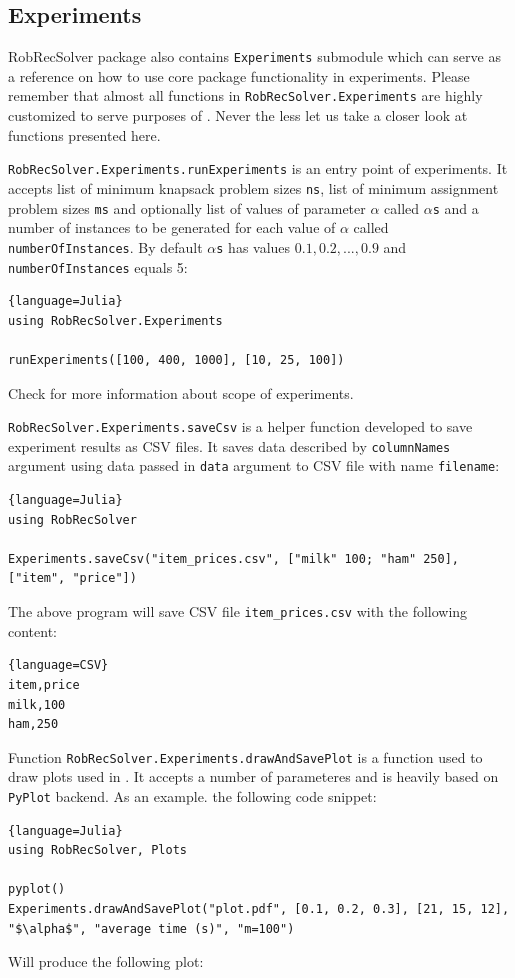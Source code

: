 \subsection{Experiments}
RobRecSolver package also contains \texttt{Experiments} submodule which can serve as a reference on how to use core package functionality in experiments. Please remember that almost all functions in \texttt{RobRecSolver.Experiments} are highly customized to serve purposes of \cite{HKZ19}. Never the less let us take a closer look at functions presented here.

\texttt{RobRecSolver.Experiments.runExperiments} is an entry point of experiments. It accepts list of minimum knapsack problem sizes \texttt{ns}, list of minimum assignment problem sizes \texttt{ms} and optionally list of values of parameter $\alpha$ called \texttt{$\alpha$s} and a number of instances to be generated for each value of $\alpha$ called \texttt{numberOfInstances}. By default \texttt{$\alpha$s} has values $0.1,0.2,...,0.9$ and \texttt{numberOfInstances} equals 5:
\begin{lstlisting}[mathescape]{language=Julia}
using RobRecSolver.Experiments

runExperiments([100, 400, 1000], [10, 25, 100])
\end{lstlisting}
Check \cite{HKZ19} for more information about scope of experiments.

\texttt{RobRecSolver.Experiments.saveCsv} is a helper function developed to save experiment results as CSV files. It saves data described by \texttt{columnNames} argument using data passed in \texttt{data} argument to CSV file with name \texttt{filename}:
\begin{lstlisting}[mathescape]{language=Julia}
using RobRecSolver

Experiments.saveCsv("item_prices.csv", ["milk" 100; "ham" 250], ["item", "price"])
\end{lstlisting}
The above program will save CSV file \texttt{item\_prices.csv} with the following content:
\begin{lstlisting}{language=CSV}
item,price
milk,100
ham,250
\end{lstlisting}

Function \texttt{RobRecSolver.Experiments.drawAndSavePlot} is a function used to draw plots used in \cite{HKZ19}. It accepts a number of parameteres and is heavily based on \texttt{PyPlot} backend. As an example. the following code snippet:
\begin{lstlisting}[mathescape]{language=Julia}
using RobRecSolver, Plots

pyplot()
Experiments.drawAndSavePlot("plot.pdf", [0.1, 0.2, 0.3], [21, 15, 12], "$\alpha$", "average time (s)", "m=100")
\end{lstlisting}
Will produce the following plot:

